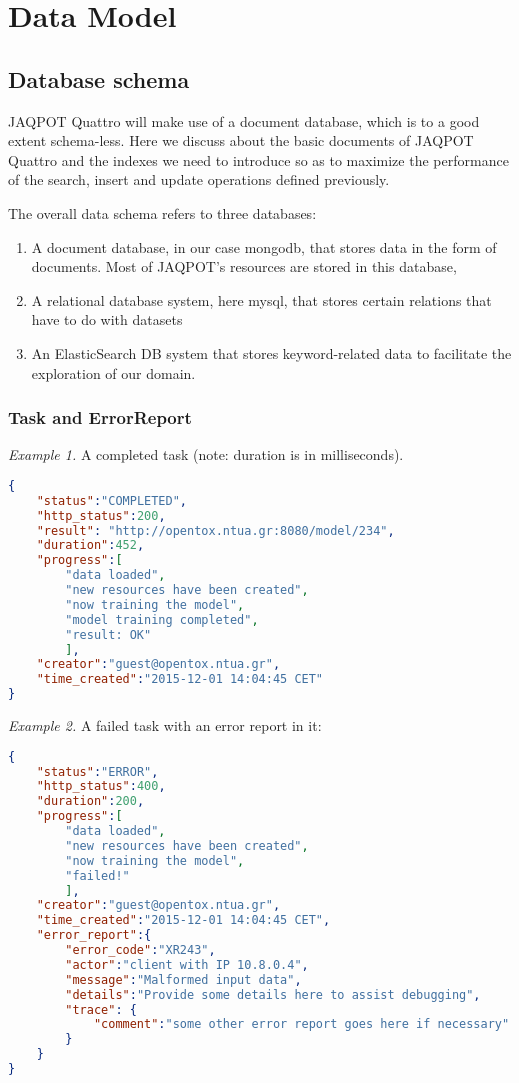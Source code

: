 \chapter{Data Model}




\section{Database schema}
JAQPOT Quattro will make use of a document database, 
which is to a good extent schema-less. Here we discuss about 
the basic documents of JAQPOT Quattro and the indexes we need to 
introduce so as to maximize the performance of the 
search, insert and update operations defined previously.

The overall data schema refers to three databases:

\begin{enumerate}
 \item  A document database, in our case mongodb, that stores data in the form of documents. 
 Most of JAQPOT’s resources are stored in this database,
\item  A relational database system, here mysql, that stores certain relations that have to do with datasets
\item  An ElasticSearch DB system that stores keyword-related data to facilitate the exploration of our domain.
\end{enumerate}

\subsection{Task and ErrorReport}

\textit{Example 1.} A completed task (note: duration is in milliseconds).

\begin{lstlisting}[language=json]
{ 
    "status":"COMPLETED", 
    "http_status":200, 
    "result": "http://opentox.ntua.gr:8080/model/234", 
    "duration":452, 
    "progress":[ 
        "data loaded", 
        "new resources have been created", 
        "now training the model", 
        "model training completed", 
        "result: OK" 
        ], 
    "creator":"guest@opentox.ntua.gr", 
    "time_created":"2015-12-01 14:04:45 CET" 
} 
\end{lstlisting}

\noindent \textit{Example 2.} A failed task with an error report in it:
\begin{lstlisting}[language=json]
{ 
    "status":"ERROR", 
    "http_status":400, 
    "duration":200, 
    "progress":[ 
        "data loaded", 
        "new resources have been created", 
        "now training the model", 
        "failed!" 
        ], 
    "creator":"guest@opentox.ntua.gr", 
    "time_created":"2015-12-01 14:04:45 CET", 
    "error_report":{ 
        "error_code":"XR243", 
        "actor":"client with IP 10.8.0.4", 
        "message":"Malformed input data", 
        "details":"Provide some details here to assist debugging", 
        "trace": { 
            "comment":"some other error report goes here if necessary" 
        } 
    } 
} 
\end{lstlisting}

